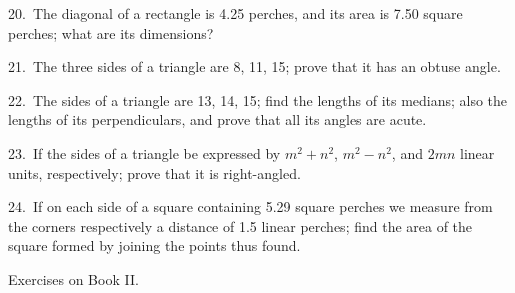 \documentclass[oneside]{book}
\newcommand\exhead[1]{
\Needspace*{5\baselineskip}\begin{center}
\textsf{#1}
\end{center}
}
\begin{document}
\begin{footnotesize}
20.~The diagonal of a rectangle is 4.25 perches, and its area is
7.50 square perches; what are its dimensions?

21.~The three sides of a triangle are 8, 11, 15; prove that it
has an obtuse angle.

22.~The sides of a triangle are 13, 14, 15; find the lengths of
its medians; also the lengths of its perpendiculars, and prove
that all its angles are acute.

23.~If the sides of a triangle be expressed by $m^2 + n^2$, $m^2 - n^2$,
and $2mn$ linear units, respectively; prove that it is right-angled.

24.~If on each side of a square containing 5.29 square perches
we measure from the corners respectively a distance of 1.5 linear
perches; find the area of the square formed by joining the points
thus found.
\par\end{footnotesize}

\exhead{Exercises on Book II\@.}
\end{document}
